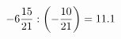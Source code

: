 \documentclass[preview]{standalone}
\begin{document}
\begin{align*}
-6 { 15 \over 21 }  :  \left( - { 10 \over 21 } \right) = 11.1
\end{align*}
\end{document}

